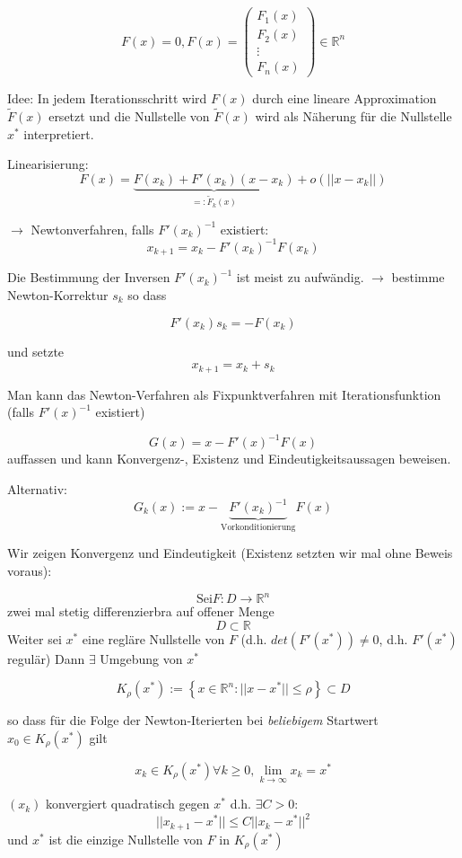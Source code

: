 \documentclass[10pt,a4paper]{article}
\begin{document}
\begin{defi}


$$F(x)=0, F(x)=\begin{pmatrix}
F_1(x)  \\ F_2(x) \\ \vdots \\ F_n(x)
\end{pmatrix} \in \mathbb{R}^{n}
$$

Idee: In jedem Iterationsschritt wird $ F(x) $ durch eine lineare Approximation $ \tilde{F}(x)$ ersetzt und die Nullstelle von $ \tilde{F}(x)$ wird als Näherung für die Nullstelle $x^{*}$ interpretiert.

Linearisierung: $$F(x) = \underbrace{F(x_k) + F'(x_k)(x-x_k)}_{=: \tilde{F}_k(x)} + o(||x-x_k||)$$

$\rightarrow$ Newtonverfahren, falls $F'(x_k)^{-1}$ existiert: $$x_{k+1} = x_k - F'(x_k)^{-1}F(x_k)$$

\end{defi}

Die Bestimmung der Inversen $F'(x_k)^{-1}$ ist meist zu aufwändig. $\rightarrow$ bestimme Newton-Korrektur $s_k$ so dass

$$F'(x_k)s_k=-F(x_k)$$

und setzte $$x_{k+1}=x_k+s_k$$

Man kann das Newton-Verfahren als Fixpunktverfahren mit Iterationsfunktion (falls $F'(x)^{-1}$ existiert)

$$G(x)=x-F'(x)^{-1}F(x)$$
auffassen und kann Konvergenz-, Existenz und Eindeutigkeitsaussagen beweisen.

Alternativ: $$G_k(x):= x-\underbrace{F'(x_k)^{-1}}_{\text{Vorkonditionierung}}F(x)$$

Wir zeigen Konvergenz und Eindeutigkeit (Existenz setzten wir mal ohne Beweis voraus):

\begin{satz}

$$\text{Sei} F:D \rightarrow \mathbb{R}^{n}$$ zwei mal stetig differenzierbra auf offener Menge $$D \subset \mathbb{R}$$ Weiter sei $x^{*}$ eine regläre Nullstelle von $F$ (d.h. $det(F'(x^{*})) \not= 0$, d.h. $F'(x^{*})$ regulär) Dann $\exists$ Umgebung von $x^{*}$

$$K_\rho (x^{*}) := \left\{  x \in \mathbb{R}^{n} : ||x-x^{*}|| \leq \rho \right\} \subset D$$

so dass für die Folge der Newton-Iterierten bei \emph{beliebigem} Startwert $x_0 \in  K_\rho(x^{*})$ gilt

$$x_k \in K_\rho(x^{*}) \forall k \geq 0, \lim\limits_{k \rightarrow \infty} x_k = x^{*}$$

$(x_k)$ konvergiert quadratisch gegen $x^{*}$ d.h. $\exists C > 0$:
$$ ||x_{k+1}-x^{*}|| \leq C ||x_{k}-x^{*}||^{2}$$ und $x^{*}$ ist die einzige Nullstelle von $F$ in $K_\rho(x^{*})$
\end{satz}
\end{document}
